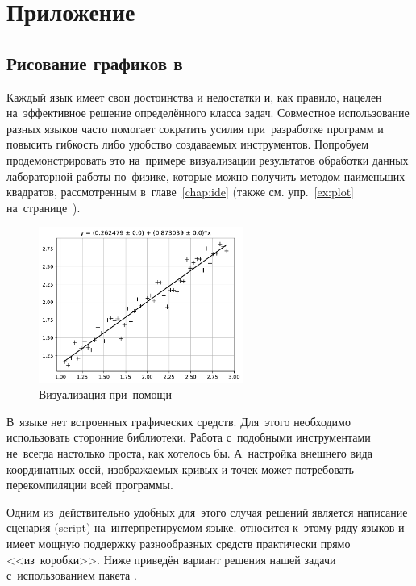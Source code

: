 
\chapter{Приложение}

\section{Рисование графиков в }\label{sect:pyplot}
Каждый язык имеет свои достоинства и недостатки и, как правило, нацелен на~эффективное решение определённого класса задач. Совместное использование разных языков часто помогает сократить усилия при~разработке программ и повысить гибкость либо удобство создаваемых инструментов. Попробуем продемонстрировать это на~примере визуализации результатов обработки данных лабораторной работы по~физике, которые можно получить методом наименьших квадратов, рассмотренным в~главе~\ref{chap:ide} (также см. упр.~\ref{ex:plot} на~странице~\pageref{ex:plot}).

\begin{figure}[ht]
  {\centering
    \includegraphics[width=0.6\textwidth]{images/line_approx.pdf}

  }
  \caption{Визуализация при~помощи }
  \label{fig:pyplot}
\end{figure}

В~языке  нет встроенных графических средств. Для~этого необходимо использовать сторонние библиотеки. Работа с~подобными инструментами не~всегда настолько проста, как хотелось бы. А~настройка внешнего вида координатных осей, изображаемых кривых и точек может потребовать перекомпиляции всей программы.

Одним из~действительно удобных для~этого случая решений является написание сценария (\textenglish{script}) на~интерпретируемом языке. \href{\pythonurl}{} относится к~этому ряду языков и имеет мощную поддержку разнообразных средств практически прямо <<из~коробки>>. Ниже приведён вариант решения нашей задачи с~использованием пакета \href{\matplotliburl}{}.

